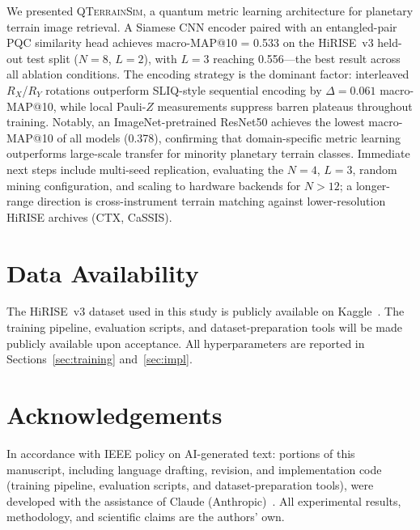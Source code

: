 \documentclass[conference,a4paper]{IEEEtran}
\newcommand{\qts}{\textsc{QTerrainSim}}
\newcommand{\RX}{R_X}
\newcommand{\RY}{R_Y}
\newcommand{\PauliZ}{Z}
\begin{document}
We presented \qts{}, a quantum metric learning architecture for
planetary terrain image retrieval.
A Siamese CNN encoder paired with an entangled-pair PQC similarity head
achieves macro-MAP@10 = 0.533 on the HiRISE~v3 held-out test split
($N{=}8$, $L{=}2$), with $L{=}3$ reaching 0.556—the best result across
all ablation conditions.
The encoding strategy is the dominant factor: interleaved $\RX$/$\RY$
rotations outperform SLIQ-style sequential encoding by $\Delta=0.061$
macro-MAP@10, while local Pauli-$\PauliZ$ measurements suppress barren
plateaus throughout training.
Notably, an ImageNet-pretrained ResNet50 achieves the lowest macro-MAP@10
of all models (0.378), confirming that domain-specific metric learning
outperforms large-scale transfer for minority planetary terrain classes.
Immediate next steps include multi-seed replication, evaluating the
$N{=}4$, $L{=}3$, random mining configuration, and scaling to hardware
backends for $N>12$; a longer-range direction is cross-instrument terrain
matching against lower-resolution HiRISE archives (CTX, CaSSIS).

\section*{Data Availability}

The HiRISE~v3 dataset used in this study is publicly available on
Kaggle~\cite{dincer2021hirise}.
The training pipeline, evaluation scripts, and dataset-preparation tools
will be made publicly available upon acceptance.
All hyperparameters are reported in Sections~\ref{sec:training}
and~\ref{sec:impl}.

\section*{Acknowledgements}
In accordance with IEEE policy on AI-generated text: portions of this
manuscript, including language drafting, revision, and implementation code
(training pipeline, evaluation scripts, and dataset-preparation tools),
were developed with the assistance of Claude (Anthropic)~\cite{anthropic2024claude}.
All experimental results, methodology, and scientific claims are the
authors' own.



\end{document}
